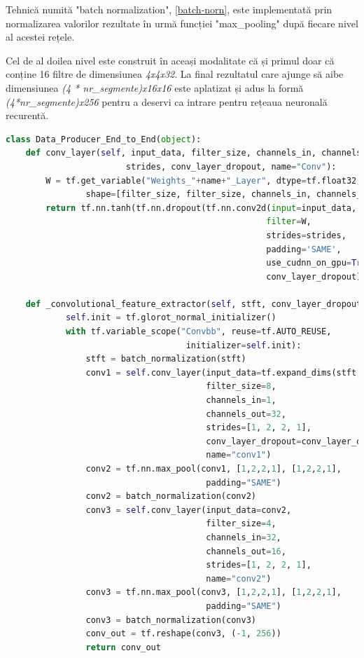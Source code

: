 \documentclass[a4paper,12pt]{book}
\begin{document}
				Tehnică numită "batch normalization", \ref{batch-norn}, este implementată prin normalizarea  valorilor rezultate în urmă funcției  "max\_pooling" după fiecare nivel al acestei rețele. \par 
				Cel de al doilea nivel este construit în aceași modalitate că și primul doar că conține 16 filtre de dimensiunea \textit{4x4x32}. La final rezultatul care ajunge să aibe dimensiunea \textit{(4 * nr\_segmente)x16x16} este aplatizat și adus la formă \textit{(4*nr\_segmente)x256} pentru a deservi ca intrare pentru rețeaua neuronală recurentă. 
				\begin{lstlisting}[language=Python, caption={Implementarea nivelelor convolutionale care realizeaza extragerea caracteristicilor in maniera end-to-end folosind procedurile librariei Tensorflow.}, xleftmargin=-1cm, label=cnn_code]
class Data_Producer_End_to_End(object):
	def conv_layer(self, input_data, filter_size, channels_in, channels_out, 
						strides, conv_layer_dropout, name="Conv"):
		W = tf.get_variable("Weights_"+name+"_Layer", dtype=tf.float32, 
				shape=[filter_size, filter_size, channels_in, channels_out])
		return tf.nn.tanh(tf.nn.dropout(tf.nn.conv2d(input=input_data, 
													filter=W, 
													strides=strides, 
													padding='SAME', 
													use_cudnn_on_gpu=True), 
													conv_layer_dropout))
					
	def _convolutional_feature_extractor(self, stft, conv_layer_dropout):
			self.init = tf.glorot_normal_initializer()
			with tf.variable_scope("Convbb", reuse=tf.AUTO_REUSE, 
									initializer=self.init):
				stft = batch_normalization(stft)
				conv1 = self.conv_layer(input_data=tf.expand_dims(stft,axis=3),
										filter_size=8, 
										channels_in=1, 
										channels_out=32, 
										strides=[1, 2, 2, 1], 
										conv_layer_dropout=conv_layer_dropout, 
										name="conv1")			
				conv2 = tf.nn.max_pool(conv1, [1,2,2,1], [1,2,2,1], 
										padding="SAME")
				conv2 = batch_normalization(conv2)
				conv3 = self.conv_layer(input_data=conv2, 
										filter_size=4, 
										channels_in=32,
										channels_out=16, 
										strides=[1, 2, 2, 1], 										conv_layer_dropout=conv_layer_dropout, 
										name="conv2")				
				conv3 = tf.nn.max_pool(conv3, [1,2,2,1], [1,2,2,1], 
										padding="SAME")
				conv3 = batch_normalization(conv3)
				conv_out = tf.reshape(conv3, (-1, 256))
				return conv_out	\end{lstlisting}		
			
\end{document}
